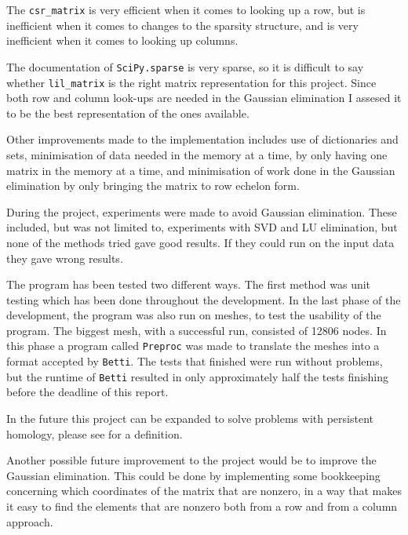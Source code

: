 \documentclass[11pt,a4paper,twoside]{report}
\begin{document}
The \texttt{csr\_matrix} is very efficient when it comes to looking up a row, but is inefficient when it comes to changes to the sparsity structure, and is very inefficient when it comes to looking up columns\cite{csr}.

The documentation of \texttt{SciPy.sparse} is very sparse, so it is difficult to say whether \texttt{lil\_matrix} is the right matrix representation for this project. Since both row and column look-ups are needed in the Gaussian elimination I assesed it to be the best representation of the ones available.

Other improvements made to the implementation includes use of dictionaries and sets, minimisation of data needed in the memory at a time, by only having one matrix in the memory at a time, and minimisation of work done in the Gaussian elimination by only bringing the matrix to row echelon form.

During the project, experiments were made to avoid Gaussian elimination. These included, but was not limited to, experiments with SVD and LU elimination, but none of the methods tried gave good results. If they could run on the input data they gave wrong results.

The program has been tested two different ways. The first method was unit testing which has been done throughout the development. In the last phase of the development, the program was also run on meshes, to test the usability of the program. The biggest mesh, with a successful run, consisted of 12806 nodes.  In this phase a program called \texttt{Preproc} was made to translate the meshes into a format accepted by \texttt{Betti}. The tests that finished were run without problems, but the runtime of \texttt{Betti} resulted in only approximately half the tests finishing before the deadline of this report.

In the future this project can be expanded to solve problems with persistent homology, please see \cite{Edelsbrunner} for a definition. 

Another possible future improvement to the project would be to improve the Gaussian elimination. This could be done by implementing some bookkeeping concerning which coordinates of the matrix that are nonzero, in a way that makes it easy to find the elements that are nonzero both from a row and from a column approach.
\end{document}
